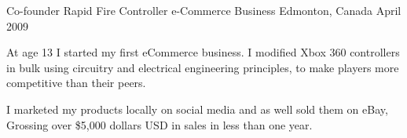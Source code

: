 

\begin{cventries}

  \cventry
    {Co-founder} %
    {Rapid Fire Controller e-Commerce Business} %
    {Edmonton, Canada} %
    {April 2009} %
    {
      \begin{cvitems} %
        \item {At age 13 I started my first eCommerce business. I modified Xbox 360 controllers in bulk using circuitry and electrical engineering principles, to make players more competitive than their peers.}
        \item {I marketed my products locally on social media and as well sold them on eBay, Grossing over \$5,000 dollars USD in sales in less than one year.}
      \end{cvitems}
    }
\end{cventries}

